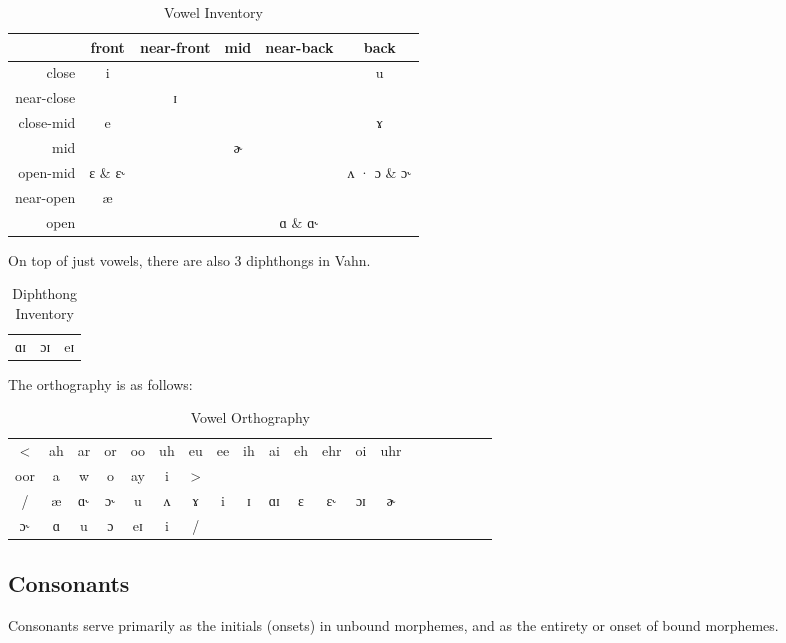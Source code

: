 \documentclass{article}
\begin{document}
\begin{table}[H]
\centering
\begin{tabular}{r|ccccc}
& front & near-front & mid & near-back & back \\
\hline
close & i & & & & u \\
near-close & & ɪ & & & \\
close-mid & e & & & & ɤ \\
mid & & & ɚ & & \\
open-mid & ɛ \& ɛ˞ & & & & ʌ · ɔ \& ɔ˞ \\
near-open & æ & & & & \\
open & & & & ɑ \& ɑ˞ & \\
\end{tabular}
\caption{Vowel Inventory}
\label{Vowel Inventory}
\end{table}

On top of just vowels, there are also 3 diphthongs in Vahn.

\begin{table}[H]
\centering
\begin{tabular}{c|c|c}
ɑɪ & ɔɪ & eɪ
\end{tabular}
\caption{Diphthong Inventory}
\label{Diphthong Inventory}
\end{table}

\noindent The orthography is as follows:

\begin{table}[H]
\centering
\begin{tabular}{cccccccccccccccccccc}
< & ah & ar & or & oo & uh & eu & ee & ih & ai & eh & ehr & oi & uhr \\
oor & a & w & o & ay & i & >\\
/ & æ & ɑ˞ & ɔ˞ & u & ʌ & ɤ & i & ɪ & ɑɪ & ɛ & ɛ˞ & ɔɪ & ɚ & \\
ɔ˞ & ɑ & u & ɔ & eɪ & i& /
\end{tabular}
\caption{Vowel Orthography}
\label{Vowel Orthography}
\end{table}

\newpage

\subsection{Consonants}

Consonants serve primarily as the initials (onsets) in unbound morphemes, and as the entirety or onset of bound morphemes.
\end{document}
